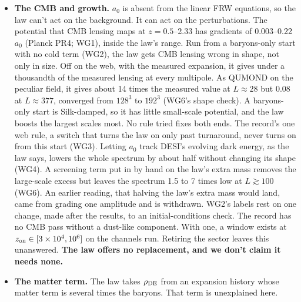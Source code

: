 \documentclass[10pt]{article}
\begin{document}
\begin{itemize}
\item \textbf{The CMB and growth.} $a_0$ is absent from the linear FRW equations, so the law can't act on the background. It can act on the perturbations. The potential that CMB lensing maps at $z=0.5$--2.33 has gradients of 0.003--0.22\,$a_0$ (Planck PR4; WG1), inside the law's range. Run from a baryons-only start with no cold term (WG2), the law gets CMB lensing wrong in shape, not only in size. Off on the web, with the measured expansion, it gives under a thousandth of the measured lensing at every multipole. As QUMOND on the peculiar field, it gives about 14 times the measured value at $L\approx28$ but 0.08 at $L\approx377$, converged from $128^3$ to $192^3$ (WG6's shape check). A baryons-only start is Silk-damped, so it has little small-scale potential, and the law boosts the largest scales most. No rule tried fixes both ends. The record's one web rule, a switch that turns the law on only past turnaround, never turns on from this start (WG3). Letting $a_0$ track DESI's evolving dark energy, as the law says, lowers the whole spectrum by about half without changing its shape (WG4). A screening term put in by hand on the law's extra mass removes the large-scale excess but leaves the spectrum 1.5 to 7 times low at $L\gtrsim100$ (WG6). An earlier reading, that halving the law's extra mass would land, came from grading one amplitude and is withdrawn. WG2's labels rest on one change, made after the results, to an initial-conditions check. The record has no CMB pass without a dust-like component. With one, a window exists at $z_{\rm on}\in[3\times10^4,10^6]$ on the channels run. Retiring the sector leaves this unanswered. \textbf{The law offers no replacement, and we don't claim it needs none.}
\item \textbf{The matter term.} The law takes $\rho_{\rm DE}$ from an expansion history whose matter term is several times the baryons. That term is unexplained here.

\end{itemize}
\end{document}
